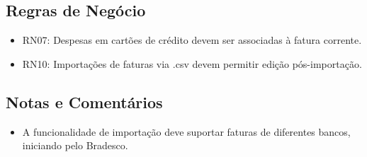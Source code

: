 \subsection*{Regras de Negócio}
\begin{addmargin}[1.5cm]{0cm}
	\begin{itemize}
		\item RN07: Despesas em cartões de crédito devem ser associadas à fatura corrente.
		\item RN10: Importações de faturas via .csv devem permitir edição pós-importação.
	\end{itemize}
\end{addmargin}

\subsection*{Notas e Comentários}
\begin{addmargin}[1.5cm]{0cm}
	\begin{itemize}
		\item A funcionalidade de importação deve suportar faturas de diferentes bancos, iniciando pelo Bradesco.
	\end{itemize}
\end{addmargin}
